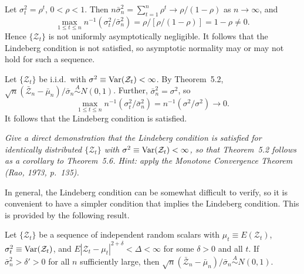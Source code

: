 \begin{example}\label{ex:geometric-var}
Let $\sigma_t^2 = \rho^t$, $0 < \rho < 1$. Then $n\bar{\sigma}_n^2 = \sum_{t=1}^{n}\rho^t \to \rho/(1 - \rho)$ as $n \to \infty$, and
\[
\max_{1 \leq t \leq n} n^{-1}(\sigma_t^2/\bar{\sigma}_n^2) = \rho/[\rho/(1-\rho)] = 1 - \rho \neq 0.
\]
Hence $\{\mathcal{Z}_t\}$ is not uniformly asymptotically negligible. It follows that the Lindeberg condition is not satisfied, so asymptotic normality may or may not hold for such a sequence.
\end{example}

\begin{example}\label{ex:iid-lindeberg}
Let $\{\mathcal{Z}_t\}$ be i.i.d.\ with $\sigma^2 \equiv \operatorname{Var}(\mathcal{Z}_t) < \infty$. By Theorem~5.2, $\sqrt{n}(\bar{\mathcal{Z}}_n - \bar{\mu}_n)/\bar{\sigma}_n \overset{A}{\sim} N(0,1)$. Further, $\bar{\sigma}_n^2 = \sigma^2$, so
\[
\max_{1 \leq t \leq n} n^{-1}(\sigma_t^2/\bar{\sigma}_n^2) = n^{-1}(\sigma^2/\sigma^2) \to 0.
\]
It follows that the Lindeberg condition is satisfied.
\end{example}

\begin{exercises}

\item\label{ex:iid-lindeberg-direct} \textit{Give a direct demonstration that the Lindeberg condition is satisfied for identically distributed $\{\mathcal{Z}_t\}$ with $\sigma^2 \equiv \operatorname{Var}(\mathcal{Z}_t) < \infty$, so that Theorem~5.2 follows as a corollary to Theorem~5.6. Hint: apply the Monotone Convergence Theorem (Rao, 1973, p.~135).}

\end{exercises}

In general, the Lindeberg condition can be somewhat difficult to verify, so it is convenient to have a simpler condition that implies the Lindeberg condition. This is provided by the following result.

\begin{theorem}\label{thm:liapounov}
Let $\{\mathcal{Z}_t\}$ be a sequence of independent random scalars with $\mu_t \equiv E(\mathcal{Z}_t)$, $\sigma_t^2 \equiv \operatorname{Var}(\mathcal{Z}_t)$, and $E|\mathcal{Z}_t - \mu_t|^{2+\delta} < \Delta < \infty$ for some $\delta > 0$ and all $t$. If $\bar{\sigma}_n^2 > \delta' > 0$ for all $n$ sufficiently large, then $\sqrt{n}(\bar{\mathcal{Z}}_n - \bar{\mu}_n)/\bar{\sigma}_n \overset{A}{\sim} N(0,1)$.
\end{theorem}

